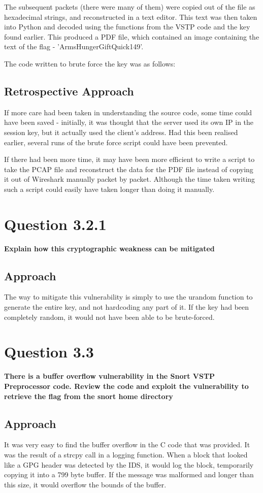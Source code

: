 The subsequent packets (there were many of them) were copied out of the file
as hexadecimal strings, and reconstructed in a text editor. This text was then
taken into Python and decoded using the functions from the VSTP code and the
key found earlier. This produced a PDF file, which contained an image containing
the text of the flag - 'ArmsHungerGiftQuick149'.

The code written to brute force the key was as follows:


\subsection{Retrospective Approach}
If more care had been taken in understanding the source code, some time could
have been saved - initially, it was thought that the server used its own IP
in the session key, but it actually used the client's address. Had this been
realised earlier, several runs of the brute force script could have been
prevented.

If there had been more time, it may have been more efficient to write a
script to take the PCAP file and reconstruct the data for the PDF file
instead of copying it out of Wireshark manually packet by packet. Although
the time taken writing such a script could easily have taken longer than
doing it manually.

\section{Question 3.2.1}
\textbf{Explain how this cryptographic weakness can be mitigated}
\subsection{Approach}
The way to mitigate this vulnerability is simply to use the urandom function
to generate the entire key, and not hardcoding any part of it. If the key had
been completely random, it would not have been able to be brute-forced. 

\section{Question 3.3}
\textbf{There is a buffer overflow vulnerability in the Snort VSTP Preprocessor
code. Review the code and exploit the vulnerability to retrieve the flag from
the snort home directory}
\subsection{Approach}
It was very easy to find the buffer overflow in the C code that was provided.
It was the result of a strcpy call in a logging function. When a block that
looked like a GPG header was detected by the IDS, it would log the block,
temporarily copying it into a 799 byte buffer. If the message was malformed
and longer than this size, it would overflow the bounds of the buffer.

